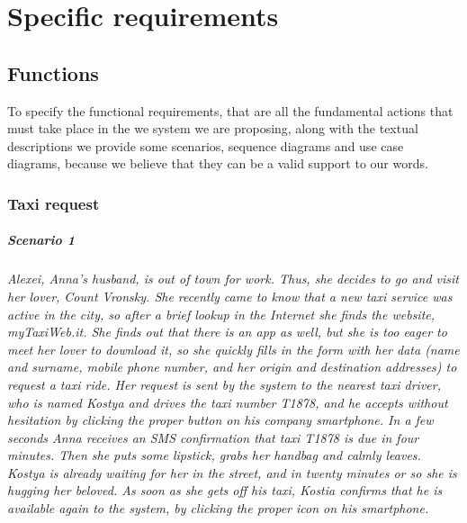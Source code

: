 \chapter{Specific requirements}\label{chap:requirements}


\section{Functions}
To specify the functional requirements, that are all the fundamental actions that must take place in the we system we are proposing, along with the textual descriptions we provide some scenarios, sequence diagrams and use case diagrams, because we believe that they can be a valid support to our words.














\subsection{Taxi request}\label{subsec:taxiRequest}


\paragraph{Scenario 1}{\small\itshape Alexei, Anna's husband, is out of town for work. Thus, she decides to go and visit her lover, Count Vronsky. She recently came to know that a new taxi service was active in the city, so after a brief lookup in the Internet she finds the website, myTaxiWeb.it. She finds out that there is an app as well, but she is too eager to meet her lover to download it, so she quickly fills in the form with her data (name and surname, mobile phone number, and her origin and destination addresses) to request a taxi ride. Her request is sent by the system to the nearest taxi driver, who is named Kostya and drives the taxi number T1878, and he accepts without hesitation by clicking the proper button on his company smartphone. In a few seconds Anna receives an SMS confirmation that taxi T1878 is due in four minutes. Then she puts some lipstick, grabs her handbag and calmly leaves. Kostya is already waiting for her in the street, and in twenty minutes or so she is hugging her beloved. As soon as she gets off his taxi, Kostia confirms that he is available again to the system, by clicking the proper icon on his smartphone.}


